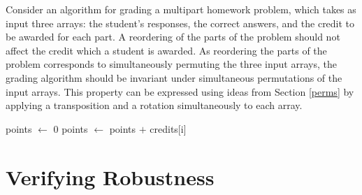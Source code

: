 \documentclass{llncs}
\DeclareMathOperator{\len}{length}
\begin{document}
Consider an algorithm for grading a multipart homework problem, which takes as input three arrays:  the student's responses, the correct answers, and the credit to be awarded for each part.  A reordering of the parts of the problem should not affect the credit which a student is awarded.  As reordering the parts of the problem corresponds to simultaneously permuting the three input arrays, the grading algorithm should be invariant under simultaneous permutations of the input arrays.  This property can be expressed using ideas from Section \ref{perms} by applying a transposition and a rotation simultaneously to each array.%
%


\begin{algorithm}
\begin{algorithmic}
\State points \(\gets\) 0
\State points \(\gets\) points \(+\) credits[i]
\EndIf
\EndFor
{}
\EndFunction
\end{algorithmic}
\end{algorithm}

\section{Verifying Robustness}
\end{document}
